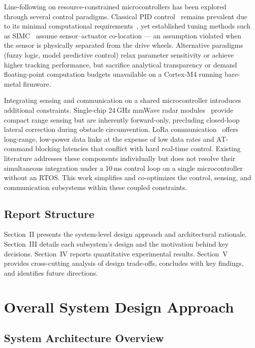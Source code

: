 \documentclass[letterpaper,journal]{IEEEtran}
\begin{document}
Line-following on resource-constrained microcontrollers has been explored through several control paradigms. Classical PID control~\cite{astrom1995pid} remains prevalent due to its minimal computational requirements~\cite{braunl2006embedded}, yet established tuning methods such as SIMC~\cite{skogestad2003simple} assume sensor--actuator co-location --- an assumption violated when the sensor is physically separated from the drive wheels. Alternative paradigms (fuzzy logic, model predictive control) relax parameter sensitivity or achieve higher tracking performance, but sacrifice analytical transparency or demand floating-point computation budgets unavailable on a Cortex-M4 running bare-metal firmware.

Integrating sensing and communication on a shared microcontroller introduces additional constraints. Single-chip 24\,GHz mmWave radar modules~\cite{ld2410s_datasheet} provide compact range sensing but are inherently forward-only, precluding closed-loop lateral correction during obstacle circumvention. LoRa communication~\cite{lorawan_spec, ewm22a_datasheet} offers long-range, low-power data links at the expense of low data rates and AT-command blocking latencies that conflict with hard real-time control. Existing literature addresses these components individually but does not resolve their simultaneous integration under a 10\,ms control loop on a single microcontroller without an RTOS. This work simplifies and co-optimizes the control, sensing, and communication subsystems within these coupled constraints.

\subsection{Report Structure}

Section~II presents the system-level design approach and architectural rationale. Section~III details each subsystem's design and the motivation behind key decisions. Section~IV reports quantitative experimental results. Section~V provides cross-cutting analysis of design trade-offs, concludes with key findings, and identifies future directions.

\section{Overall System Design Approach}

\subsection{System Architecture Overview}
\end{document}
